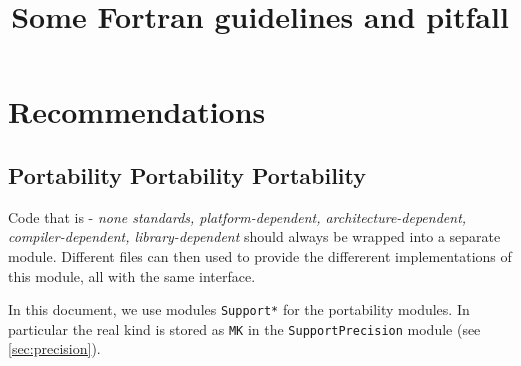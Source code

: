 \documentclass{article}
\title{Some Fortran guidelines and pitfall}
\begin{document}
\maketitle
\tableofcontents
\section{Recommendations}
\subsection{Portability Portability Portability}
Code that is - \textit{none standards, platform-dependent, architecture-dependent, compiler-dependent, library-dependent}
should always be wrapped into a separate module. Different files can then used to provide the differerent implementations of this module, all with the same interface.

In this document, we use modules \verb|Support*| for the portability modules.
In particular the real kind is stored as \verb|MK| in the \verb|SupportPrecision| module (see \autoref{sec:precision}).




\end{document}
